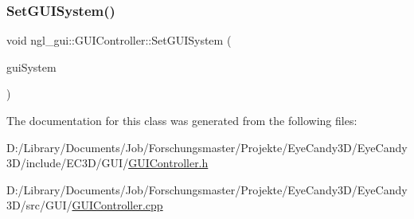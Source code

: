 \subsubsection{\texorpdfstring{Set\+G\+U\+I\+System()}{SetGUISystem()}}
{\footnotesize\ttfamily void ngl\+\_\+gui\+::\+G\+U\+I\+Controller\+::\+Set\+G\+U\+I\+System (\begin{DoxyParamCaption}\item[{\mbox{\hyperlink{classngl__gui_1_1_g_u_i_system}{G\+U\+I\+System}} $\ast$}]{gui\+System }\end{DoxyParamCaption})}



The documentation for this class was generated from the following files\+:\begin{DoxyCompactItemize}
\item 
D\+:/\+Library/\+Documents/\+Job/\+Forschungsmaster/\+Projekte/\+Eye\+Candy3\+D/\+Eye\+Candy3\+D/include/\+E\+C3\+D/\+G\+U\+I/\mbox{\hyperlink{_g_u_i_controller_8h}{G\+U\+I\+Controller.\+h}}\item 
D\+:/\+Library/\+Documents/\+Job/\+Forschungsmaster/\+Projekte/\+Eye\+Candy3\+D/\+Eye\+Candy3\+D/src/\+G\+U\+I/\mbox{\hyperlink{_g_u_i_controller_8cpp}{G\+U\+I\+Controller.\+cpp}}\end{DoxyCompactItemize}
